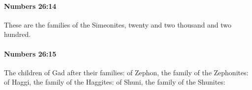 		\paragraph{Numbers 26:14} %
			\label{NUMBERS-26-14}

			These are the families of the Simeonites, twenty and two thousand and two hundred.


		\paragraph{Numbers 26:15} %
			\label{NUMBERS-26-15}

			The children of Gad after their families: of Zephon, the family of the Zephonites: of Haggi, the family of the Haggites: of Shuni, the family of the Shunites:



